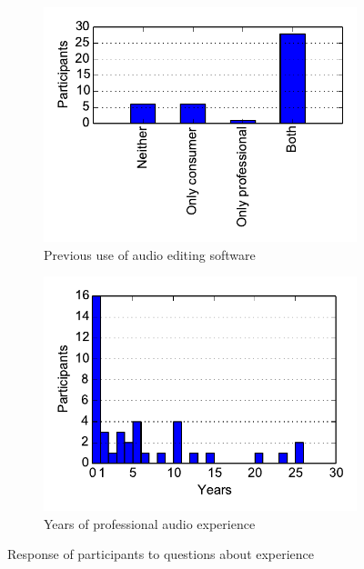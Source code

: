 \begin{figure}[ht]
\centering
\begin{subfigure}{.5\textwidth}
  \centering
  \includegraphics[width=\textwidth]{figs/daw.pdf}
  \caption{Previous use of audio editing software}
  \label{fig:experiencedaw}
\end{subfigure}%
\begin{subfigure}{.5\textwidth}
  \centering
  \includegraphics[width=\linewidth]{figs/experience.pdf}
  \caption{Years of professional audio experience}
  \label{fig:experienceyears}
\end{subfigure}
\caption{Response of participants to questions about experience}
\label{fig:experience}
\end{figure}

